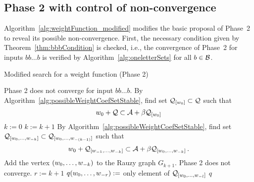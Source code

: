 \subsection*{Phase 2 with control of non-convergence}
Algorithm~\ref{alg:weightFunction_modified} modifies the basic proposal of Phase~2 to reveal its possible non-convergence. First, the necessary condition given by Theorem~\ref{thm:bbbCondition} is checked, i.e., the convergence of Phase~2 for inputs $bb\dots b$ is verified by Algorithm~\ref{alg:oneletterSets} for all $b\in\mathcal{B}$. 

\begin{algorithm}
  \caption{Modified search for a weight function (Phase 2)}
    \label{alg:weightFunction_modified}
  \begin{algorithmic}[1]
    		\RETURN Phase 2 does not converge for input $bb\dots b$.
    	\ENDIF
    \ENDFOR
        \STATE By Algorithm~\ref{alg:possibleWeightCoefSetStable}, find set $\mathcal{Q}_{[w_0]} \subset \mathcal{Q}$ such that
          $$
          w_0 + \mathcal{Q} \subset \mathcal{A} + \beta \mathcal{Q}_{[w_0]}
          $$\vspace{-20pt}
    \ENDFOR
    \STATE $k:=0$
        \STATE $k:= k +1$
            \STATE By Algorithm~\ref{alg:possibleWeightCoefSetStable}, find set $\mathcal{Q}_{[w_{0}, \dots, w_{-k}]} \subset \mathcal{Q}_{[w_{0}, \dots, w_{-(k-1)}]}$ such that
              $$
              w_0 + \mathcal{Q}_{[w_{-1}, \dots, w_{-k}]} \subset \mathcal{A} + \beta \mathcal{Q}_{[w_{0}, \dots, w_{-k}]}\,.
              $$\vspace{-20pt}
              	\STATE Add the vertex $(w_{0}, \dots, w_{-k})$ to the Rauzy graph $G_{k+1}$.
              		\RETURN Phase 2 does not converge.
              	\ENDIF
              \ENDIF
        \ENDFOR  
    \ENDWHILE  
    \STATE $r:= k+1$
	    		\STATE $q(w_{0}, \dots, w_{-r}):=$ only element of $\mathcal{Q}_{[w_{0}, \dots, w_{-l}]}$
	    	\ENDFOR
	    \ENDFOR
	\ENDFOR
    \RETURN $q$
  \end{algorithmic}
\end{algorithm}

